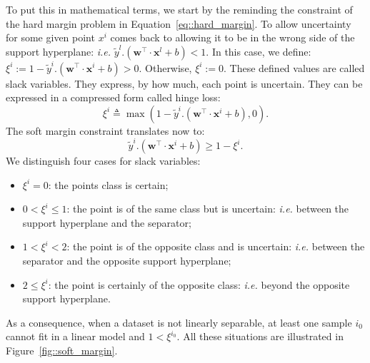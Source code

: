                 To put this in mathematical terms, we start by the reminding the constraint of the hard margin problem in Equation~\ref{eq::hard_margin}.
                To allow uncertainty for some given point $x^i$ comes back to allowing it to be in the wrong side of the support hyperplane: \textit{i.e.} $\tilde{y}^l.(\bm{w}^\intercal\cdot\bm{x}^l + b) < 1$.
                In this case, we define: $\xi^i := 1 - \tilde{y}^i.(\bm{w}^\intercal\cdot\bm{x}^i + b) > 0$.
                Otherwise, $\xi^i := 0$.
                These defined values are called slack variables.
                They express, by how much, each point is uncertain.
                They can be expressed in a compressed form called hinge loss:
                \begin{equation}
                    \label{eq::slack_variables}
                    \xi^i \triangleq \max\left(1 - \tilde{y}^i.(\bm{w}^\intercal\cdot\bm{x}^i + b), 0\right).
                \end{equation}
                The soft margin constraint translates now to:
                \begin{equation}
                    \label{eq::soft_margin}
                    \tilde{y}^i.(\bm{w}^\intercal\cdot\bm{x}^i + b) \geq 1 - \xi^i.
                \end{equation}
                We distinguish four cases for slack variables:
                \begin{itemize}
                    \item $\xi^i = 0$: the points class is certain;
                    \item $0 < \xi^i \leq 1$: the point is of the same class but is uncertain: \textit{i.e.} between the support hyperplane and the separator;
                    \item $1 < \xi^i < 2$: the point is of the opposite class and is uncertain: \textit{i.e.} between the separator and the opposite support hyperplane;
                    \item $2 \leq \xi^i$: the point is certainly of the opposite class: \textit{i.e.} beyond the opposite support hyperplane.
                \end{itemize}
                As a consequence, when a dataset is not linearly separable, at least one sample $i_0$ cannot fit in a linear model and $1 < \xi^{i_0}$.
                All these situations are illustrated in Figure~\ref{fig::soft_margin}.\\

